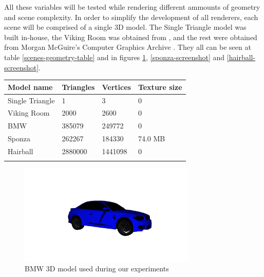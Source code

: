 All these variables will be tested while rendering different ammounts of geometry and scene complexity. In order to simplify the development of all renderers, each scene will be comprised of a single 3D model. The Single Triangle model was built in-house, the Viking Room was obtained from \cite{VulkanTutorial}, and the rest were obtained from Morgan McGuire's Computer Graphics Archive \cite{McGuire2022Data}. They all can be seen at table \ref{scenes-geometry-table} and in figures \ref{bmw-screenshot}, \ref{sponza-screenshot} and \ref{hairball-screenshot}.

\begin{center}
  \begin{tabular}{ | m{3cm} | m{3cm}| m{3cm}|m{3cm} |}
  \hline
  Model name& Triangles& Vertices& Texture size\\
  \hline
    Single Triangle& 1& 3& 0\\
  \hline
    Viking Room& 2000& 2600& 0\\
  \hline
    BMW& 385079& 249772& 0\\
  \hline
    Sponza& 262267& 184330& 74.0 MB\\
  \hline
    Hairball& 2880000& 1441098&0\\
  \label{scenes-geometry-table}
\end{tabular}
\end{center}

\begin{figure}[hbt!]
  \centering
  \includegraphics[width=0.75\textwidth]{figuras/bmw.png}
  \caption{BMW 3D model used during our experiments}
  \label{bmw-screenshot}
\end{figure}

